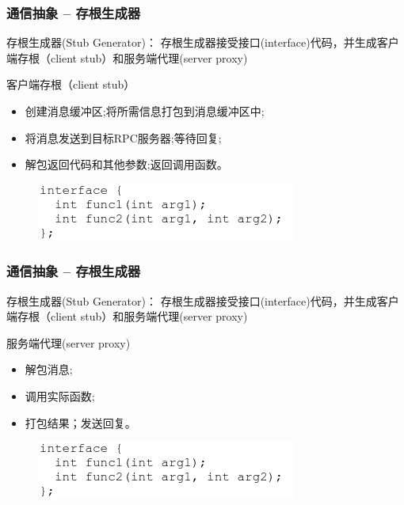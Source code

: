 \begin{frame}[fragile]
    \frametitle{通信抽象 -- 存根生成器}
    存根生成器(Stub Generator)：    存根生成器接受接口(interface)代码，并生成客户端存根（client stub）和服务端代理(server proxy)
    
    客户端存根（client stub）
    \begin{itemize}
        \item 创建消息缓冲区;将所需信息打包到消息缓冲区中;
        \item 将消息发送到目标RPC服务器;等待回复;
        \item 解包返回代码和其他参数;返回调用函数。

    \end{itemize}
    
        \begin{figure}
            \includegraphics[width=0.6\linewidth]{figs/rpc-interface.png}
        \end{figure}
\end{frame}

\begin{frame}[fragile]
    \frametitle{通信抽象 -- 存根生成器}
    存根生成器(Stub Generator)：    存根生成器接受接口(interface)代码，并生成客户端存根（client stub）和服务端代理(server proxy)
    
    服务端代理(server proxy)
    \begin{itemize}
        \item 解包消息;
        \item 调用实际函数;
        \item 打包结果；发送回复。
        
    \end{itemize}
    
    \begin{figure}
        \includegraphics[width=0.6\linewidth]{figs/rpc-interface.png}
    \end{figure}
\end{frame}

